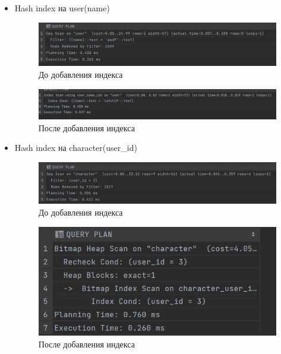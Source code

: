 \begin{itemize}
    \item Hash index на user(name)
    
    \begin{figure}[H]
	\begin{center}
		\includegraphics[scale=0.7]{images/user_name_not_index.png}
            \caption{До добавления индекса}
	\end{center}
    \end{figure}
    \begin{figure}[H]
	\begin{center}
		\includegraphics[scale=0.4]{images/user_name_index.jpg}
            \caption{После добавления индекса}
	\end{center}
    \end{figure}
    
    \item Hash index на character(user\_id)
    \begin{figure}[H]
	\begin{center}
		\includegraphics[scale=0.7]{images/character_user_id_before.jpg}
            \caption{До добавления индекса}
	\end{center}
    \end{figure}
    \begin{figure}[H]
	\begin{center}
		\includegraphics[scale=1]{images/character_user_id_after.jpg}
            \caption{После добавления индекса}
	\end{center}
    \end{figure}


\end{itemize}
